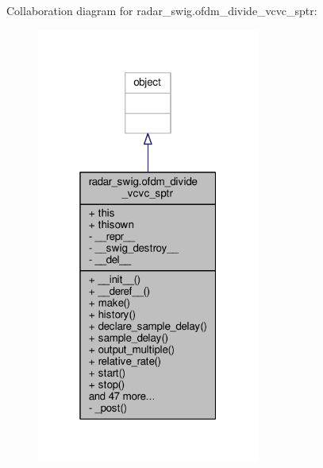 Collaboration diagram for radar\+\_\+swig.\+ofdm\+\_\+divide\+\_\+vcvc\+\_\+sptr\+:
\nopagebreak
\begin{figure}[H]
\begin{center}
\leavevmode
\includegraphics[width=208pt]{d3/ddc/classradar__swig_1_1ofdm__divide__vcvc__sptr__coll__graph}
\end{center}
\end{figure}

